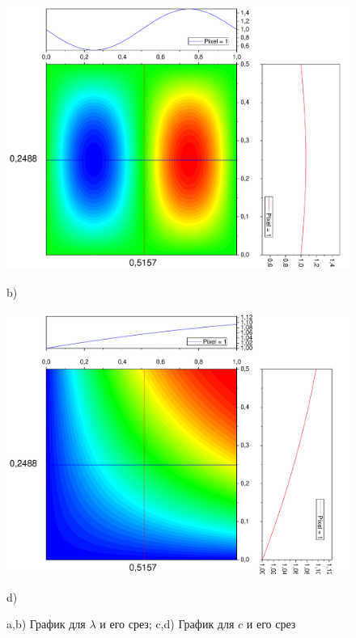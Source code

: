 \documentclass[a4paper,12pt]{article}
\begin{document}
\begin{figure}[h!]
\begin{center}
		\begin{minipage}[h]{0.24\linewidth}
			\includegraphics[width=\textwidth]{graphs/graphs_a/ro_srez.pdf} \begin{center}	b)	\end{center}
		\end{minipage}
		\begin{minipage}[h]{0.24\linewidth}
			\includegraphics[width=\textwidth]{graphs/graphs_a/T_srez.pdf} \begin{center}	d)	\end{center}
		\end{minipage}
	\end{center}
	\caption{a,b) График для $\lambda$ и его срез; \qquad c,d) График для $c$ и его срез}
\end{figure}
\end{document}
